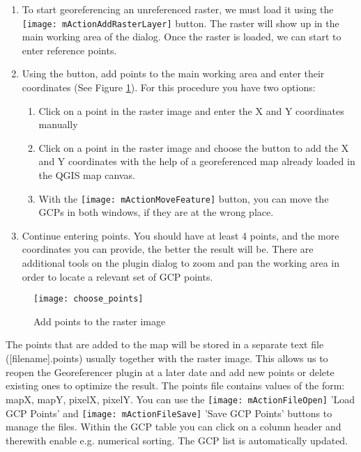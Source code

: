 \begin{enumerate}
\item To start georeferencing an unreferenced raster, we must load it using 
the \texttt{[image: mActionAddRasterLayer]} button. The raster 
will show up in the main working area of the dialog. Once the raster is 
loaded, we can start to enter reference points.
\item Using the  button, add 
points to the main working area and enter their coordinates 
(See Figure \ref{fig:choose_points}). For this procedure you have two 
options:

\begin{enumerate}
\item Click on a point in the raster image and enter the X and Y coordinates manually
\item Click on a point in the raster image and choose the button 
 to add the X and Y coordinates with the help 
of a georeferenced map already loaded in the QGIS map canvas.
\item With the \texttt{[image: mActionMoveFeature]} button, you can move 
the GCPs in both windows, if they are at the wrong place. 
\end{enumerate}
\item Continue entering points. You should have at least 4 points, and the 
more coordinates you can provide, the better the result will be. There are 
additional tools on the plugin dialog to zoom and pan the working area in 
order to locate a relevant set of GCP points.
\end{enumerate}

\begin{figure}[ht]
\centering
  \texttt{[image: choose\_points]}
  \caption{Add points to the raster image \nixcaption}\label{fig:choose_points}
\end{figure}

The points that are added to the map will be stored in a separate text 
file ([filename].points) usually together with the raster image. 
This allows us to reopen the Georeferencer plugin at a later date and add 
new points or delete existing ones to optimize the result. The points file 
contains values of the form: mapX, mapY, pixelX, pixelY. You can use the 
\texttt{[image: mActionFileOpen]} 'Load GCP Points' and 
\texttt{[image: mActionFileSave]} 'Save GCP Points' buttons to 
manage the files. Within the GCP table you can click on a column header and 
therewith enable e.g. numerical sorting. The GCP list is automatically updated.

